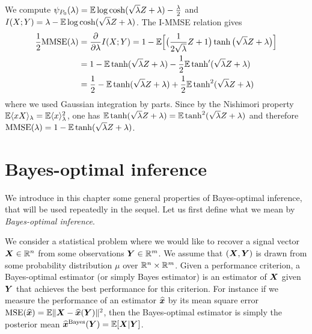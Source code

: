 \documentclass[12pt,nocut]{article}
\begin{document}
\begin{example}[Rademacher prior: $P_0 = \frac{1}{2} \delta_{+1} + \frac{1}{2} \delta_{-1}$] We compute $\psi_{P_0}(\lambda) = \mathbb{E} \log \cosh(\sqrt{\lambda} Z + \lambda)- \frac{\lambda}{2}$ and $I(X;Y) = \lambda - \mathbb{E} \log \cosh(\sqrt{\lambda} Z + \lambda)$. The I-MMSE relation gives
			\begin{align*}
				\frac{1}{2} {{\rm MMSE}}(\lambda) 
				&= \frac{\partial}{\partial \lambda} I(X;Y)
				= 1 - \mathbb{E} \Big[\big(\frac{1}{2\sqrt{\lambda}}Z+1\big) \tanh\big(\sqrt{\lambda}Z + \lambda\big)\Big]
				\\
				&= 1 - \mathbb{E} \tanh(\sqrt{\lambda}Z + \lambda) - \frac{1}{2} \mathbb{E} \tanh'(\sqrt{\lambda}Z + \lambda)
				\\
				&= \frac{1}{2} - \mathbb{E} \tanh(\sqrt{\lambda}Z + \lambda) + \frac{1}{2} \mathbb{E} \tanh^2(\sqrt{\lambda}Z + \lambda)
			\end{align*}
			where we used Gaussian integration by parts. Since by the Nishimori property $\mathbb{E} \langle x X \rangle_{\lambda} = \mathbb{E} \langle x \rangle_{\lambda}^2$, one has $\mathbb{E} \tanh(\sqrt{\lambda}Z + \lambda) = \mathbb{E} \tanh^2(\sqrt{\lambda}Z + \lambda)$ and therefore ${{\rm MMSE}}(\lambda) = 1 - \mathbb{E} \tanh(\sqrt{\lambda}Z + \lambda)$.
\end{example}


\section{Bayes-optimal inference}
We introduce in this chapter some general properties of Bayes-optimal inference, that will be used repeatedly in the sequel.
Let us first define what we mean by \textit{Bayes-optimal inference}.

We consider a statistical problem where we would like to recover a signal vector ${\boldsymbol X} \in \mathbb{R}^n$ from some observations ${\boldsymbol Y} \in \mathbb{R}^m$.
We assume that $({\boldsymbol X},{\boldsymbol Y})$ is drawn from some probability distribution $\mu$ over $\mathbb{R}^{n} \times \mathbb{R}^m$. Given a performance criterion, a Bayes-optimal estimator (or simply Bayes estimator) is an estimator of ${\boldsymbol X}$ given ${\boldsymbol Y}$ that achieves the best performance for this criterion. For instance if we measure the performance of an estimator $\widehat{{\boldsymbol x}}$ by its mean square error ${{\rm MSE}}(\widehat{{\boldsymbol x}}) = \mathbb{E} \| {\boldsymbol X} - \widehat{{\boldsymbol x}}({\boldsymbol Y}) \|^2$, then the Bayes-optimal estimator is simply the posterior mean $\widehat{{\boldsymbol x}}^{\rm Bayes}({\boldsymbol Y}) = \mathbb{E}[{\boldsymbol X}|{\boldsymbol Y}]$.
\\
\end{document}
